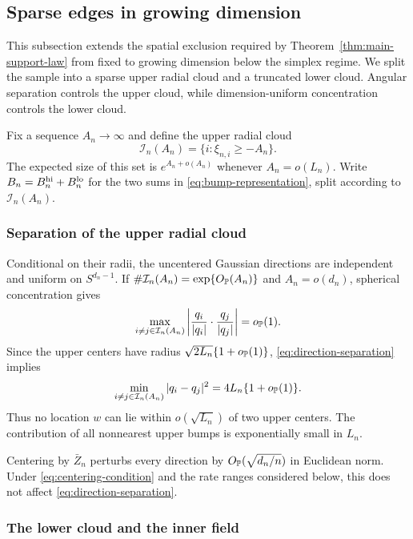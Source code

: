 \subsection{Sparse edges in growing dimension}
\label{sec:proof-program}

This subsection extends the spatial exclusion required by
Theorem~\ref{thm:main-support-law} from fixed to growing dimension below the
simplex regime. We split the sample into a sparse upper radial cloud and a
truncated lower cloud. Angular separation controls the upper cloud, while
dimension-uniform concentration controls the lower cloud.

Fix a sequence \(A_n\to\infty\) and define the upper radial cloud
\begin{equation}
\label{eq:upper-cloud}
  \mathcal I_n(A_n)
  =
  \{i:\xi_{n,i}\ge-A_n\}.
\end{equation}
The expected size of this set is \(e^{A_n+o(A_n)}\) whenever
\(A_n=o(L_n)\). Write \(B_n=B_n^{\rm hi}+B_n^{\rm lo}\) for the two sums
in \eqref{eq:bump-representation}, split according to
\(\mathcal I_n(A_n)\).

\subsubsection{Separation of the upper radial cloud}

Conditional on their radii, the uncentered Gaussian directions are
independent and uniform on \(S^{d_n-1}\). If
\(\#\mathcal I_n(A_n)=\exp\{O_{\mathbb P}(A_n)\}\) and \(A_n=o(d_n)\), spherical
concentration gives
\begin{equation}
\label{eq:direction-separation}
  \max_{i\ne j\in\mathcal I_n(A_n)}
  \left|
    \frac{q_i}{|q_i|}\cdot\frac{q_j}{|q_j|}
  \right|
  =o_{\mathbb P}(1).
\end{equation}
Since the upper centers have radius
\(\sqrt{2L_n}\{1+o_{\mathbb P}(1)\}\),
\eqref{eq:direction-separation} implies
\[
  \min_{i\ne j\in\mathcal I_n(A_n)}|q_i-q_j|^2
  =
  4L_n\{1+o_{\mathbb P}(1)\}.
\]
Thus no location \(w\) can lie within \(o(\sqrt{L_n})\) of two upper
centers. The contribution of all nonnearest upper bumps is exponentially
small in \(L_n\).

Centering by \(\bar Z_n\) perturbs every direction by
\(O_{\mathbb P}(\sqrt{d_n/n})\) in Euclidean norm. Under
\eqref{eq:centering-condition} and the rate ranges considered below, this
does not affect \eqref{eq:direction-separation}.

\subsubsection{The lower cloud and the inner field}


